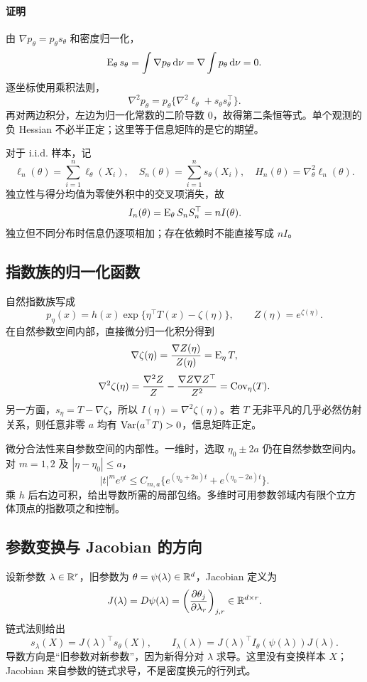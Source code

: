 \paragraph{证明}
由 $\nabla p_\theta=p_\theta s_\theta$ 和密度归一化，
\[
 \operatorname{E}_\theta s_\theta
 =\int\nabla p_\theta\,\mathrm d\nu
 =\nabla\int p_\theta\,\mathrm d\nu=0.
\]
逐坐标使用乘积法则，
\[
 \nabla^2p_\theta
 =p_\theta\{\nabla^2\ell_\theta+s_\theta s_\theta^\top\}.
\]
再对两边积分，左边为归一化常数的二阶导数 $0$，故得第二条恒等式。单个观测的负 Hessian 不必半正定；这里等于信息矩阵的是它的期望。

对于 i.i.d. 样本，记
\[
 \ell_n(\theta)=\sum_{i=1}^n\ell_\theta(X_i),\quad
 S_n(\theta)=\sum_{i=1}^ns_\theta(X_i),\quad
 H_n(\theta)=\nabla_\theta^2\ell_n(\theta).
\]
独立性与得分均值为零使外积中的交叉项消失，故
\[
 I_n(\theta)=\operatorname{E}_\theta S_nS_n^\top=nI(\theta).
\]
独立但不同分布时信息仍逐项相加；存在依赖时不能直接写成 $nI$。

\subsection{指数族的归一化函数}
自然指数族写成
\[
 p_\eta(x)=h(x)\exp\{\eta^\top T(x)-\zeta(\eta)\},
 \qquad Z(\eta)=e^{\zeta(\eta)}.
\]
在自然参数空间内部，直接微分归一化积分得到
\[
 \nabla\zeta(\eta)=\frac{\nabla Z(\eta)}{Z(\eta)}=\operatorname{E}_\eta T,
\]
\[
 \nabla^2\zeta(\eta)
 =\frac{\nabla^2Z}{Z}-\frac{\nabla Z\nabla Z^\top}{Z^2}
 =\operatorname{Cov}_\eta(T).
\]
另一方面，$s_\eta=T-\nabla\zeta$，所以 $I(\eta)=\nabla^2\zeta(\eta)$。若 $T$ 无非平凡的几乎必然仿射关系，则任意非零 $a$ 均有 $\operatorname{Var}(a^\top T)>0$，信息矩阵正定。

微分合法性来自参数空间的内部性。一维时，选取 $\eta_0\pm2a$ 仍在自然参数空间内。对 $m=1,2$ 及 $|\eta-\eta_0|\le a$，
\[
 |t|^me^{\eta t}
 \le C_{m,a}\{e^{(\eta_0+2a)t}+e^{(\eta_0-2a)t}\}.
\]
乘 $h$ 后右边可积，给出导数所需的局部包络。多维时可用参数邻域内有限个立方体顶点的指数项之和控制。

\subsection{参数变换与 Jacobian 的方向}
设新参数 $\lambda\in\mathbb R^r$，旧参数为 $\theta=\psi(\lambda)\in\mathbb R^d$，Jacobian 定义为
\[
 J(\lambda)=D\psi(\lambda)
 =\left(\frac{\partial\theta_j}{\partial\lambda_r}\right)_{j,r}
 \in\mathbb R^{d\times r}.
\]
链式法则给出
\[
 s_\lambda(X)=J(\lambda)^\top s_\theta(X),\qquad
 I_\lambda(\lambda)=J(\lambda)^\top
 I_\theta(\psi(\lambda))J(\lambda).
\]
导数方向是“旧参数对新参数”，因为新得分对 $\lambda$ 求导。这里没有变换样本 $X$；Jacobian 来自参数的链式求导，不是密度换元的行列式。

